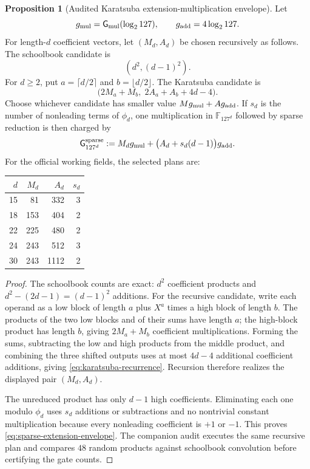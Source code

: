 \documentclass[11pt,a4paper]{article}
\theoremstyle{definition}
\newtheorem{proposition}[theorem]{Proposition}
\theoremstyle{remark}
\newcommand{\F}{\mathbb F}
\newcommand{\Gmul}{\mathsf G_{\rm mul}}
\begin{document}
\begin{proposition}[Audited Karatsuba extension-multiplication envelope]\label{prop:sparse-extension-envelope}
Let
\[
 g_{\rm mul}=\Gmul(\log_2 127),
 \qquad g_{\rm add}=4\log_2 127.
\]
For length-$d$ coefficient vectors, let $(M_d,A_d)$ be chosen recursively as
follows.  The schoolbook candidate is
\[
 (d^2,(d-1)^2).
\]
For $d\ge2$, put $a=\lceil d/2\rceil$ and $b=\lfloor d/2\rfloor$.  The
Karatsuba candidate is
\begin{equation}\label{eq:karatsuba-recurrence}
 \bigl(2M_a+M_b,\;2A_a+A_b+4d-4\bigr).
\end{equation}
Choose whichever candidate has smaller value $Mg_{\rm mul}+Ag_{\rm add}$.
If $s_d$ is the number of nonleading terms of $\phi_d$, one multiplication in
$\F_{127^d}$ followed by sparse reduction is then charged by
\begin{equation}\label{eq:sparse-extension-envelope}
 \mathsf G^{\rm sparse}_{127^d}
 :=M_dg_{\rm mul}+\bigl(A_d+s_d(d-1)\bigr)g_{\rm add}.
\end{equation}
For the official working fields, the selected plans are:
\begin{center}
\begin{tabular}{@{}rrrr@{}}
\toprule
$d$ & $M_d$ & $A_d$ & $s_d$\\
\midrule
15&81&332&3\\
18&153&404&2\\
22&225&480&2\\
24&243&512&3\\
30&243&1112&2\\
\bottomrule
\end{tabular}
\end{center}
\end{proposition}

\begin{proof}
The schoolbook counts are exact: $d^2$ coefficient products and
$d^2-(2d-1)=(d-1)^2$ additions.  For the recursive candidate, write each
operand as a low block of length $a$ plus $X^a$ times a high block of length
$b$.  The products of the two low blocks and of their sums have length $a$;
the high-block product has length $b$, giving $2M_a+M_b$ coefficient
multiplications.  Forming the sums, subtracting the low and high products from
the middle product, and combining the three shifted outputs uses at most
$4d-4$ additional coefficient additions, giving
\eqref{eq:karatsuba-recurrence}.  Recursion therefore realizes the displayed
pair $(M_d,A_d)$.

The unreduced product has only $d-1$ high coefficients.  Eliminating each one
modulo $\phi_d$ uses $s_d$ additions or subtractions and no nontrivial constant
multiplication because every nonleading coefficient is $+1$ or $-1$.  This
proves \eqref{eq:sparse-extension-envelope}.  The companion audit executes the
same recursive plan and compares $48$ random products against schoolbook
convolution before certifying the gate counts.
\end{proof}
\end{document}
